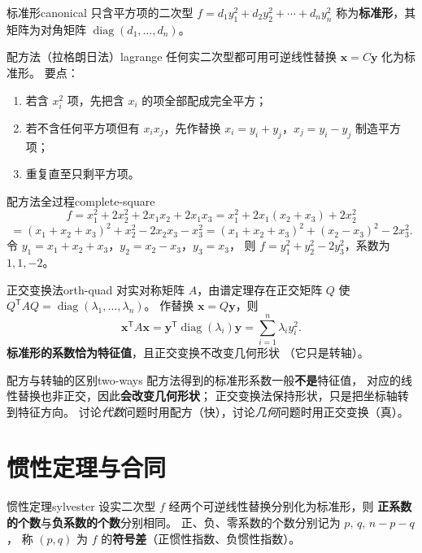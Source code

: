 \documentclass[11pt,a4paper,openany]{ctexbook}
\DeclareMathOperator{\diag}{diag}
\begin{document}
\begin{defn}{标准形}{canonical}
只含平方项的二次型
$f=d_1y_1^2+d_2y_2^2+\cdots+d_ny_n^2$
称为\textbf{标准形}，其矩阵为对角矩阵 $\diag(d_1,\dots,d_n)$。
\end{defn}

\begin{thm}{配方法（拉格朗日法）}{lagrange}
任何实二次型都可用可逆线性替换 $\boldsymbol{x}=C\boldsymbol{y}$ 化为标准形。
要点：
\begin{enumerate}[label=(\arabic*), itemsep=1pt]
\item 若含 $x_i^2$ 项，先把含 $x_i$ 的项全部配成完全平方；
\item 若不含任何平方项但有 $x_ix_j$，先作替换
      $x_i=y_i+y_j$，$x_j=y_i-y_j$ 制造平方项；
\item 重复直至只剩平方项。
\end{enumerate}
\end{thm}

\begin{exmp}{配方法全过程}{complete-square}
\[
f=x_1^2+2x_2^2+2x_1x_2+2x_1x_3
=x_1^2+2x_1(x_2+x_3)+2x_2^2
\]
\[
=(x_1+x_2+x_3)^2+x_2^2-2x_2x_3-x_3^2
=(x_1+x_2+x_3)^2+(x_2-x_3)^2-2x_3^2.
\]
令 $y_1=x_1+x_2+x_3$，$y_2=x_2-x_3$，$y_3=x_3$，
则 $f=y_1^2+y_2^2-2y_3^2$，系数为 $1,1,-2$。
\end{exmp}

\begin{thm}{正交变换法}{orth-quad}
对实对称矩阵 $A$，由谱定理存在正交矩阵 $Q$ 使 $Q^{\mathsf T}AQ=\diag(\lambda_1,\dots,\lambda_n)$。
作替换 $\boldsymbol{x}=Q\boldsymbol{y}$，则
\[
\boldsymbol{x}^{\mathsf T}A\boldsymbol{x}
=\boldsymbol{y}^{\mathsf T}\diag(\lambda_i)\boldsymbol{y}
=\sum_{i=1}^{n}\lambda_i y_i^2.
\]
\textbf{标准形的系数恰为特征值}，且正交变换不改变几何形状
（它只是转轴）。
\end{thm}

\begin{remk}{配方与转轴的区别}{two-ways}
配方法得到的标准形系数一般\textbf{不是}特征值，
对应的线性替换也非正交，因此\textbf{会改变几何形状}；
正交变换法保持形状，只是把坐标轴转到特征方向。
讨论\emph{代数}问题时用配方（快），讨论\emph{几何}问题时用正交变换（真）。
\end{remk}

\section{惯性定理与合同}

\begin{thm}{惯性定理}{sylvester}
设实二次型 $f$ 经两个可逆线性替换分别化为标准形，则
\textbf{正系数的个数}与\textbf{负系数的个数}分别相同。
正、负、零系数的个数分别记为 $p,\,q,\,n-p-q$，
称 $(p,q)$ 为 $f$ 的\textbf{符号差}（正惯性指数、负惯性指数）。
\end{thm}
\end{document}
